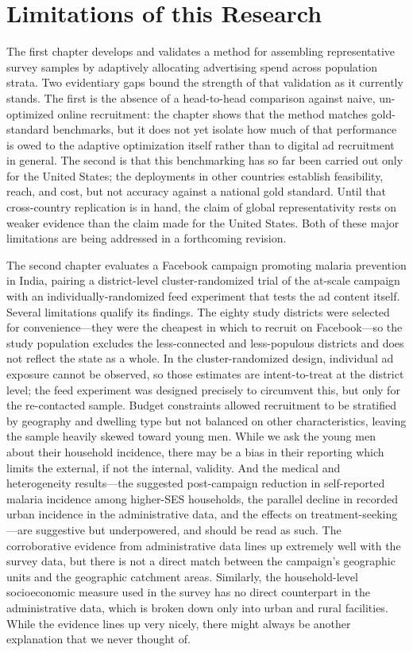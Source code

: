 \section{Limitations of this Research}

The first chapter develops and validates a method for assembling representative survey samples by adaptively allocating advertising spend across population strata. Two evidentiary gaps bound the strength of that validation as it currently stands. The first is the absence of a head-to-head comparison against naive, un-optimized online recruitment: the chapter shows that the method matches gold-standard benchmarks, but it does not yet isolate how much of that performance is owed to the adaptive optimization itself rather than to digital ad recruitment in general. The second is that this benchmarking has so far been carried out only for the United States; the deployments in other countries establish feasibility, reach, and cost, but not accuracy against a national gold standard. Until that cross-country replication is in hand, the claim of global representativity rests on weaker evidence than the claim made for the United States. Both of these major limitations are being addressed in a forthcoming revision. 


The second chapter evaluates a Facebook campaign promoting malaria prevention in India, pairing a district-level cluster-randomized trial of the at-scale campaign with an individually-randomized feed experiment that tests the ad content itself. Several limitations qualify its findings. The eighty study districts were selected for convenience---they were the cheapest in which to recruit on Facebook---so the study population excludes the less-connected and less-populous districts and does not reflect the state as a whole. In the cluster-randomized design, individual ad exposure cannot be observed, so those estimates are intent-to-treat at the district level; the feed experiment was designed precisely to circumvent this, but only for the re-contacted sample. Budget constraints allowed recruitment to be stratified by geography and dwelling type but not balanced on other characteristics, leaving the sample heavily skewed toward young men. While we ask the young men about their household incidence, there may be a bias in their reporting which limits the external, if not the internal, validity. And the medical and heterogeneity results---the suggested post-campaign reduction in self-reported malaria incidence among higher-SES households, the parallel decline in recorded urban incidence in the administrative data, and the effects on treatment-seeking---are suggestive but underpowered, and should be read as such. The corroborative evidence from administrative data lines up extremely well with the survey data, but there is not a direct match between the campaign's geographic units and the geographic catchment areas. Similarly, the household-level socioeconomic measure used in the survey has no direct counterpart in the administrative data, which is broken down only into urban and rural facilities. While the evidence lines up very nicely, there might always be another explanation that we never thought of. 


